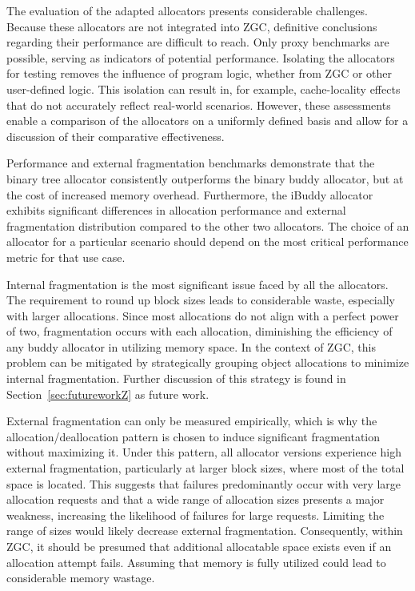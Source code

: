 The evaluation of the adapted allocators presents considerable challenges. Because these allocators are not integrated into ZGC, definitive conclusions regarding their performance are difficult to reach. Only proxy benchmarks are possible, serving as indicators of potential performance. Isolating the allocators for testing removes the influence of program logic, whether from ZGC or other user-defined logic. This isolation can result in, for example, cache-locality effects that do not accurately reflect real-world scenarios. However, these assessments enable a comparison of the allocators on a uniformly defined basis and allow for a discussion of their comparative effectiveness.

Performance and external fragmentation benchmarks demonstrate that the binary tree allocator consistently outperforms the binary buddy allocator, but at the cost of increased memory overhead. Furthermore, the iBuddy allocator exhibits significant differences in allocation performance and external fragmentation distribution compared to the other two allocators. The choice of an allocator for a particular scenario should depend on the most critical performance metric for that use case.

Internal fragmentation is the most significant issue faced by all the allocators. The requirement to round up block sizes leads to considerable waste, especially with larger allocations. Since most allocations do not align with a perfect power of two, fragmentation occurs with each allocation, diminishing the efficiency of any buddy allocator in utilizing memory space. In the context of ZGC, this problem can be mitigated by strategically grouping object allocations to minimize internal fragmentation. Further discussion of this strategy is found in Section~\ref{sec:futureworkZ} as future work.

External fragmentation can only be measured empirically, which is why the allocation/deallocation pattern is chosen to induce significant fragmentation without maximizing it. Under this pattern, all allocator versions experience high external fragmentation, particularly at larger block sizes, where most of the total space is located. This suggests that failures predominantly occur with very large allocation requests and that a wide range of allocation sizes presents a major weakness, increasing the likelihood of failures for large requests. Limiting the range of sizes would likely decrease external fragmentation. Consequently, within ZGC, it should be presumed that additional allocatable space exists even if an allocation attempt fails. Assuming that memory is fully utilized could lead to considerable memory wastage.

